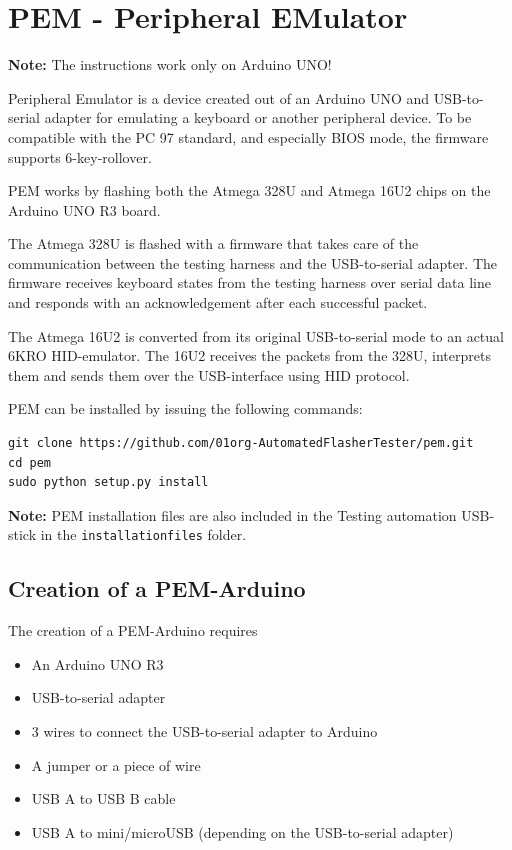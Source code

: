 \documentclass[a4paper,11pt]{article}
\newcommand{\note}{\textbf{Note: }}
\newcommand{\cmd}[1]{\texttt{#1}}
\begin{document}
\section{PEM - Peripheral EMulator}
\label{pem}

\note{The instructions work only on Arduino UNO!}

Peripheral Emulator is a device created out of an Arduino UNO and USB-to-serial adapter for emulating a keyboard or another peripheral device. To be compatible with the PC 97 standard, and especially BIOS mode, the firmware supports 6-key-rollover.

PEM works by flashing both the Atmega 328U and Atmega 16U2 chips on the Arduino UNO R3 board. 

The Atmega 328U is flashed with a firmware that takes care of the communication between the testing harness and the USB-to-serial adapter. The firmware receives keyboard states from the testing harness over serial data line and responds with an acknowledgement after each successful packet.

The Atmega 16U2 is converted from its original USB-to-serial mode to an actual 6KRO HID-emulator. The 16U2 receives the packets from the 328U, interprets them and sends them over the USB-interface using HID protocol.

PEM can be installed by issuing the following commands:
\begin{lstlisting}
git clone https://github.com/01org-AutomatedFlasherTester/pem.git
cd pem
sudo python setup.py install
\end{lstlisting}
\note{PEM installation files are also included in the Testing automation USB-stick in the \cmd{installationfiles} folder.}

\subsection{Creation of a PEM-Arduino}
\label{pemarduino}
The creation of a PEM-Arduino requires 
\begin{itemize}
\item An Arduino UNO R3
\item USB-to-serial adapter
\item 3 wires to connect the USB-to-serial adapter to Arduino
\item A jumper or a piece of wire
\item USB A to USB B cable
\item USB A to mini/microUSB (depending on the USB-to-serial adapter)
\end{itemize}
\end{document}
